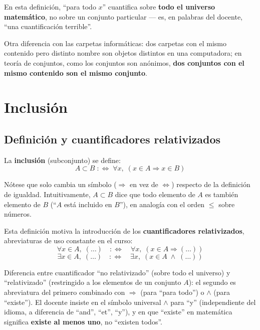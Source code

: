 \documentclass[12pt,a4paper]{article}
\begin{document}
\begin{notebox}
En esta definición, ``para todo $x$'' cuantifica sobre \textbf{todo el
universo matemático}, no sobre un conjunto particular --- es, en palabras
del docente, ``una cuantificación terrible''.
\end{notebox}

Otra diferencia con las carpetas informáticas: dos carpetas con el mismo
contenido pero distinto nombre son objetos distintos en una computadora;
en teoría de conjuntos, como los conjuntos son anónimos, \textbf{dos
conjuntos con el mismo contenido son el mismo conjunto}.

\section{Inclusión}

\subsection{Definición y cuantificadores relativizados}

La \textbf{inclusión} (subconjunto) se define:
\[
A \subset B \;:\Longleftrightarrow\; \forall x,\; (x \in A \Longrightarrow x \in B)
\]

Nótese que solo cambia un símbolo ($\Rightarrow$ en vez de
$\Leftrightarrow$) respecto de la definición de igualdad. Intuitivamente,
$A \subset B$ dice que todo elemento de $A$ es también elemento de $B$
(``$A$ está incluido en $B$''), en analogía con el orden $\le$ sobre
números.

Esta definición motiva la introducción de los \textbf{cuantificadores
relativizados}, abreviaturas de uso constante en el curso:
\[
\forall x \in A,\; (\ldots) \quad:\Longleftrightarrow\quad \forall x,\; (x \in A \Rightarrow (\ldots))
\]
\[
\exists x \in A,\; (\ldots) \quad:\Longleftrightarrow\quad \exists x,\; (x \in A \;\wedge\; (\ldots))
\]

\begin{notebox}
Diferencia entre cuantificador ``no relativizado'' (sobre todo el
universo) y ``relativizado'' (restringido a los elementos de un conjunto
$A$): el segundo es abreviatura del primero combinado con $\Rightarrow$
(para ``para todo'') o $\wedge$ (para ``existe''). El docente insiste en
el símbolo universal $\wedge$ para ``y'' (independiente del idioma, a
diferencia de ``and'', ``et'', ``y''), y en que ``existe'' en matemática
significa \textbf{existe al menos uno}, no ``existen todos''.
\end{notebox}
\end{document}
